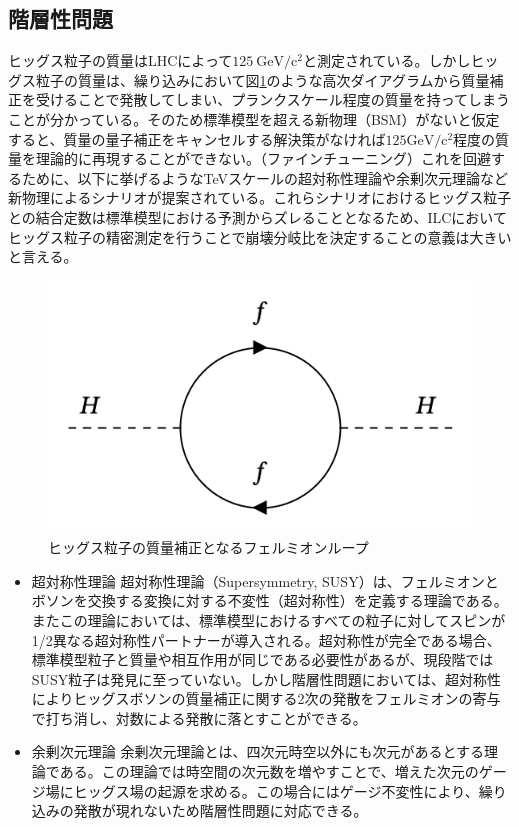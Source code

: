 \subsection{階層性問題}
ヒッグス粒子の質量はLHCによって$125\ \mathrm{GeV/c^2}$と測定されている。しかしヒッグス粒子の質量は、繰り込みにおいて図\ref{hierarchy}のような高次ダイアグラムから質量補正を受けることで発散してしまい、プランクスケール程度の質量を持ってしまうことが分かっている。そのため標準模型を超える新物理（BSM）がないと仮定すると、質量の量子補正をキャンセルする解決策がなければ$125\mathrm{GeV/c^2}$程度の質量を理論的に再現することができない。（ファインチューニング）これを回避するために、以下に挙げるようなTeVスケールの超対称性理論や余剰次元理論など新物理によるシナリオが提案されている。これらシナリオにおけるヒッグス粒子との結合定数は標準模型における予測からズレることとなるため、ILCにおいてヒッグス粒子の精密測定を行うことで崩壊分岐比を決定することの意義は大きいと言える。
\begin{figure}[h]
	\begin{center}
 \includegraphics[keepaspectratio, scale=0.4]
 	{Figure/Introduction/feynman.png}
 		\caption{ヒッグス粒子の質量補正となるフェルミオンループ}
 		\label{hierarchy}
	\end{center}
\end{figure}
\begin{itemize}
\item{超対称性理論}
超対称性理論（Supersymmetry, SUSY）は、フェルミオンとボソンを交換する変換に対する不変性（超対称性）を定義する理論である。またこの理論においては、標準模型におけるすべての粒子に対してスピンが1/2異なる超対称性パートナーが導入される。超対称性が完全である場合、標準模型粒子と質量や相互作用が同じである必要性があるが、現段階ではSUSY粒子は発見に至っていない。しかし階層性問題においては、超対称性によりヒッグスボソンの質量補正に関する2次の発散をフェルミオンの寄与で打ち消し、対数による発散に落とすことができる。
\item{余剰次元理論}
余剰次元理論とは、四次元時空以外にも次元があるとする理論である。この理論では時空間の次元数を増やすことで、増えた次元のゲージ場にヒッグス場の起源を求める。この場合にはゲージ不変性により、繰り込みの発散が現れないため階層性問題に対応できる。
\end{itemize}
